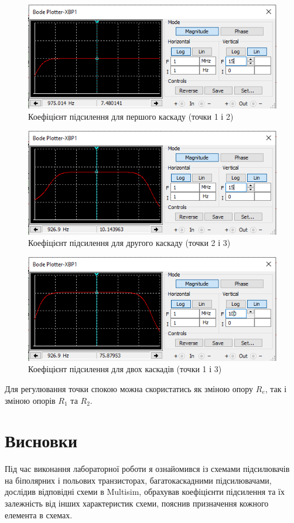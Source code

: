 \documentclass{article}
\begin{document}
\begin{normalsize}
	\begin{figure}[H]
		\centering
		\includegraphics[width=\textwidth]{33}
		\caption{Коефіцієнт підсилення для першого каскаду (точки 1 і 2)}
	\end{figure}
	
	\begin{figure}[H]
		\centering
		\includegraphics[width=\textwidth]{34}
		\caption{Коефіцієнт підсилення для другого каскаду (точки 2 і 3)}
	\end{figure}
	
	\begin{figure}[H]
		\centering
		\includegraphics[width=\textwidth]{35}
		\caption{Коефіцієнт підсилення для двох каскадів (точки 1 і 3)}
	\end{figure}
	
	Для регулювання точки спокою можна скористатись як зміною опору $R_e$, так і зміною опорів $R_1$ та $R_2$.
	
	\section*{Висновки}
	Під час виконання лабораторної роботи я ознайомився із схемами підсилювачів на біполярних і польових транзисторах, багатокаскадними підсилювачами, дослідив відповідні схеми в Multisim, обрахував коефіцієнти підсилення та їх залежність від інших характеристик схеми, пояснив призначення кожного елемента в схемах.
	    
\end{normalsize}
\end{document}

